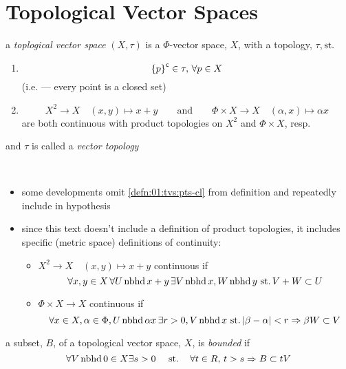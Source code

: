 \section{Topological Vector Spaces}

\begin{defn}
  a \emph{toplogical vector space} ${(X,\tau)}$ is a
  $\Phi$-vector space, $X$, with a topology, $\tau$,$\operatorname{\,st.}$
  \begin{enumerate}[label=(\alph*)]
  \item\label{defn:01:tvs:pts-cl}
    \[ {\{p\}}^{\mathsf{c}}\in\tau,\,\forall p\in X \]
    (i.e. --- every point is a closed set)
  \item
    \[
    X^2\rightarrow X \quad (x,y)\mapsto x+y
    \qquad\text{and}\qquad
    \Phi\times X\rightarrow X \quad (\alpha, x)\mapsto \alpha x
    \]
    are both continuous with product topologies on
    $X^2$ and ${\Phi\times X}$, resp.
  \end{enumerate}
  and $\tau$ is called a \emph{vector topology}
\end{defn}

\begin{rem}{}\
  \begin{itemize}
  \item
    some developments omit \ref{defn:01:tvs:pts-cl} from
    definition and repeatedly include in hypothesis
  \item
    since this text doesn't include a definition of product topologies,
    it includes specific (metric space) definitions of continuity:
    \begin{itemize}
    \item
      ${X^2\rightarrow X \quad (x,y)\mapsto x+y}$ continuous if
      \[
      \forall x,y\in X\,\forall U\operatorname{nbhd} x + y\,
      \exists V\operatorname{nbhd} x, W\operatorname{nbhd} y
      \operatorname{\,st.} V + W \subset U
      \]
    \item
      ${\Phi\times X\rightarrow X}$ continuous if
      \[
      \forall x\in X, \alpha\in\Phi, U\operatorname{nbhd} \alpha x\,
      \exists r>0, V\operatorname{nbhd} x
      \operatorname{\,st.}
      |\beta-\alpha|<r\Rightarrow \beta W\subset V
      \]
    \end{itemize}
  \end{itemize}
\end{rem}

\begin{defn}
  a subset, $B$, of a topological vector space, $X$,
  is \emph{bounded} if
  \[
  \forall V\operatorname{nbhd} 0\in X\exists s>0
  \quad\operatorname{\,st.}\quad
  \forall t\in R,\, t>s\Rightarrow B\subset tV
  \]
\end{defn}

